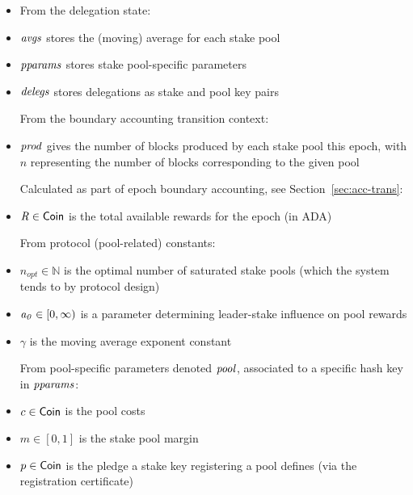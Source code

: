 \begin{itemize}
\item[] From the delegation state:
\item $\mathit{avgs}$ stores the (moving) average for each
stake pool
\item $\mathit{pparams}$ stores stake pool-specific parameters
\item $\mathit{delegs}$ stores delegations as stake and pool key pairs \medskip

From the boundary accounting transition context:
\item $\mathit{prod}$ gives the number of blocks produced by each stake pool
this epoch, with $n$ representing the number of blocks corresponding to the
given pool \medskip

Calculated as part of epoch boundary accounting, see
Section~\ref{sec:acc-trans}:
\item $\mathit{R} \in \mathsf{Coin}$ is the total available rewards for the epoch (in ADA) \medskip

From protocol (pool-related) constants:
\item $n_{opt} \in \mathbb{N}$ is the optimal number of saturated stake pools (which the system
tends to by protocol design)
\item $\mathit{a_0} \in [0, \infty)$ is a parameter determining leader-stake
influence on pool rewards
\item $\gamma$ is the moving average exponent constant \medskip

From pool-specific parameters denoted $\mathit{pool}$, associated to a specific
hash key in $\mathit{pparams}$:
\item $c \in \mathsf{Coin}$ is the pool costs
\item $m \in [0,1]$ is the stake pool margin
\item $p \in \mathsf{Coin}$ is the pledge a stake key registering a pool defines (via
the registration certificate)\medskip


\end{itemize}
